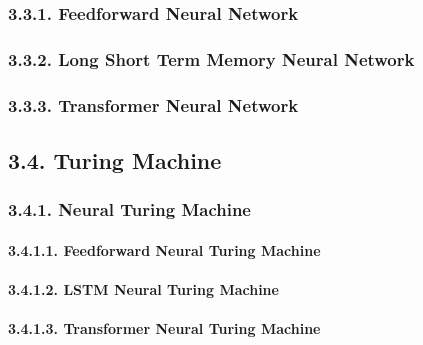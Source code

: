\documentclass[
]{article}
\begin{document}
\hypertarget{feedforward-neural-network}{%
\subsubsection{3.3.1. Feedforward Neural
Network}\label{feedforward-neural-network}}

\hypertarget{long-short-term-memory-neural-network}{%
\subsubsection{3.3.2. Long Short Term Memory Neural
Network}\label{long-short-term-memory-neural-network}}

\hypertarget{transformer-neural-network}{%
\subsubsection{3.3.3. Transformer Neural
Network}\label{transformer-neural-network}}

\hypertarget{turing-machine}{%
\subsection{3.4. Turing Machine}\label{turing-machine}}

\hypertarget{neural-turing-machine}{%
\subsubsection{3.4.1. Neural Turing
Machine}\label{neural-turing-machine}}

\hypertarget{feedforward-neural-turing-machine}{%
\paragraph{3.4.1.1. Feedforward Neural Turing
Machine}\label{feedforward-neural-turing-machine}}

\hypertarget{lstm-neural-turing-machine}{%
\paragraph{3.4.1.2. LSTM Neural Turing
Machine}\label{lstm-neural-turing-machine}}

\hypertarget{transformer-neural-turing-machine}{%
\paragraph{3.4.1.3. Transformer Neural Turing
Machine}\label{transformer-neural-turing-machine}}
\end{document}
